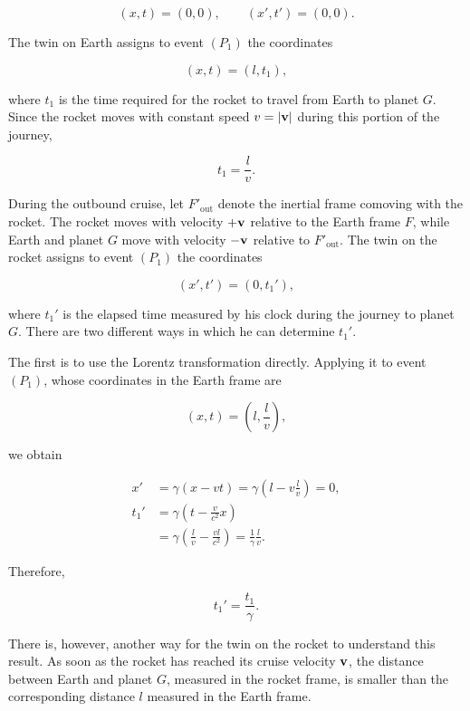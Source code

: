 \documentclass[12pt]{article}
\begin{document}
\[
  (x,t)=(0,0),
  \qquad
  (x',t')=(0,0).
\]

The twin on Earth assigns to event $(P_1)$ the coordinates

\[
  (x,t)=(l,t_1),
\]

where $t_1$ is the time required for the rocket to travel from Earth to planet $G$.
Since the rocket moves with constant speed $v=|\vb v|$ during this portion of the
journey,

\begin{equation}
  t_1=\frac{l}{v}.
  \label{eq:outbound_time_earth}
\end{equation}

During the outbound cruise, let $F'_{\mathrm{out}}$ denote the inertial frame comoving with
the rocket. The rocket moves with velocity $+\vb v$ relative to the Earth frame $F$, while
Earth and planet $G$ move with velocity $-\vb v$ relative to $F'_{\mathrm{out}}$. The twin on
the rocket assigns to event $(P_1)$ the coordinates

\[
  (x',t')=(0,t_1'),
\]

where $t_1'$ is the elapsed time measured by his clock during the journey to planet
$G$. There are two different ways in which he can determine $t_1'$. \par

The first is to use the Lorentz transformation directly. Applying it to event $(P_1)$,
whose coordinates in the Earth frame are

\[
  (x,t)=\left(l,\frac{l}{v}\right),
\]

we obtain

\begin{equation}
  \begin{aligned}
    x'
    &=
    \gamma(x-vt)
    =
    \gamma\left(
      l-v\frac{l}{v}
    \right)
    =
    0,
    \\
    t_1'
    &=
    \gamma\left(
      t-\frac{v}{c^2}x
    \right)
    \\
    &=
    \gamma\left(
      \frac{l}{v}-\frac{vl}{c^2}
    \right)
    =
    \frac{1}{\gamma}\frac{l}{v}.
  \end{aligned}
  \label{eq:outbound_time_rocket_lorentz}
\end{equation}

Therefore,

\begin{equation}
  t_1'=\frac{t_1}{\gamma}.
  \label{eq:outbound_time_relation}
\end{equation}

There is, however, another way for the twin on the rocket to understand this result.
As soon as the rocket has reached its cruise velocity $\vb v$, the distance between
Earth and planet $G$, measured in the rocket frame, is smaller than the corresponding
distance $l$ measured in the Earth frame. \par
\end{document}
